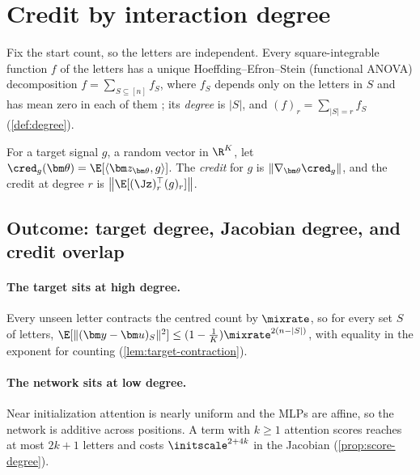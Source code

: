 \section{Credit by interaction degree}
\label{sec:credit}

Fix the start count, so the letters are independent. Every square-integrable function $f$ of the letters has a unique
Hoeffding--Efron--Stein (functional ANOVA) decomposition $f=\sum_{S\subseteq[n]}f_S$, where $f_S$ depends only on the letters in $S$ and has mean zero
in each of them \citep{efron1981jackknife}; its \emph{degree} is $|S|$, and $(f)_r=\sum_{|S|=r}f_S$ (\cref{def:degree}).

\begin{definition}[Credit]
\label{def:credit}
For a target signal $g$, a random vector in $\R^K$, let $\cred_g(\bm\theta)=\E[\langle\bm z_{\bm\theta},g\rangle]$. The
\emph{credit} for $g$ is $\|\nabla_{\bm\theta}\cred_g\|$, and the credit at degree $r$ is
$\bigl\|\E[(\Jz)_r^\top(g)_r]\bigr\|$.
\end{definition}

\subsection{Outcome: target degree, Jacobian degree, and credit overlap}
\paragraph{The target sits at high degree.} Every unseen letter contracts the centred count by $\mixrate$, so for every
set $S$ of letters, $\E[\|(\bm y-\bm u)_S\|^2]\le(1-\tfrac{1}{K})\mixrate^{2(n-|S|)}$, with equality in the exponent for counting
(\cref{lem:target-contraction}).

\paragraph{The network sits at low degree.} Near initialization attention is nearly uniform and the MLPs are affine, so
the network is additive across positions. A term with $k\ge1$ attention scores reaches at most $2k+1$ letters and costs
$\initscale^{2+4k}$ in the Jacobian (\cref{prop:score-degree}).

